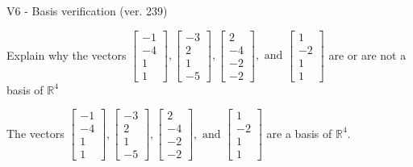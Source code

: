 \begin{exercise}
  \begin{exerciseTitle}V6 - Basis verification (ver. 239)\end{exerciseTitle}
  \begin{exerciseStatement}
    Explain why the vectors \(\left[\begin{array}{r}
-1 \\
-4 \\
1 \\
1
\end{array}\right] , \left[\begin{array}{r}
-3 \\
2 \\
1 \\
-5
\end{array}\right] , \left[\begin{array}{r}
2 \\
-4 \\
-2 \\
-2
\end{array}\right] , \text{ and } \left[\begin{array}{r}
1 \\
-2 \\
1 \\
1
\end{array}\right]\) are or are not a basis of \(\mathbb{R}^4\)	


  \end{exerciseStatement}
  \begin{exerciseAnswer}
   The vectors \(\left[\begin{array}{r}
-1 \\
-4 \\
1 \\
1
\end{array}\right] , \left[\begin{array}{r}
-3 \\
2 \\
1 \\
-5
\end{array}\right] , \left[\begin{array}{r}
2 \\
-4 \\
-2 \\
-2
\end{array}\right] , \text{ and } \left[\begin{array}{r}
1 \\
-2 \\
1 \\
1
\end{array}\right]\) 
  	 are  a basis of \(\mathbb{R}^4\).
  


  \end{exerciseAnswer}
\end{exercise}